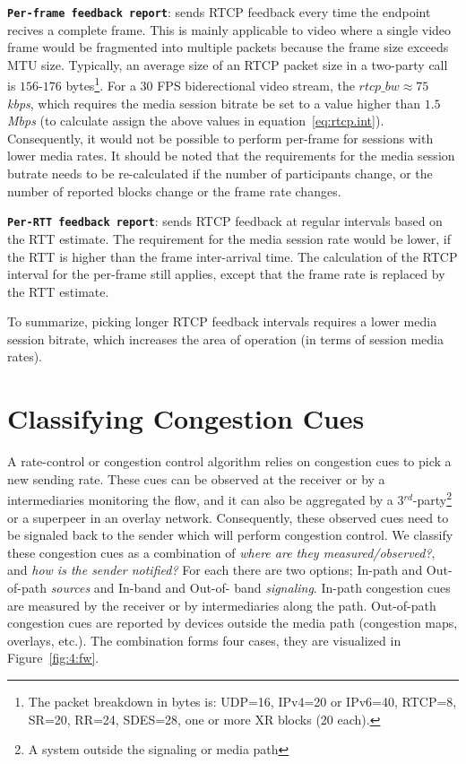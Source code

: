 \textbf{\texttt{Per-frame feedback report}}: sends RTCP feedback every time
the endpoint recives a complete frame. This is mainly applicable to video
where a single video frame would be fragmented into multiple packets because
the frame size exceeds MTU size. Typically, an average size of an RTCP packet
size in a two-party call is $156$-$176$ bytes\footnote{The packet breakdown in
bytes is: UDP=16, IPv4=20 or IPv6=40, RTCP=8, SR=20, RR=24, SDES=28, one or
more XR blocks (20 each).}. For a 30 FPS biderectional video stream, the
$rtcp\_bw \approx 75$ \emph{kbps}, which requires the media session bitrate be
set to a value higher than $1.5$ \emph{Mbps} (to calculate assign the above
values in equation~\ref{eq:rtcp.int}). Consequently, it would not be possible
to perform per-frame for sessions with lower media rates. It should be noted
that the requirements for the media session butrate needs to be re-calculated
if the number of participants change, or the number of reported blocks change
or the frame rate changes.

\textbf{\texttt{Per-RTT feedback report}}: sends RTCP feedback at regular
intervals based on the RTT estimate. The requirement for the media session
rate would be lower, if the RTT is higher than the frame inter-arrival time.
The calculation of the RTCP interval for the per-frame still applies, except
that the frame rate is replaced by the RTT estimate.

To summarize, picking longer RTCP feedback intervals requires a lower media
session bitrate, which increases the area of operation (in terms of session
media rates).

\section{Classifying Congestion Cues}
\label{fw.fw}

A rate-control or congestion control algorithm relies on congestion cues to
pick a new sending rate. These cues can be observed at the receiver or by a
intermediaries monitoring the flow, and it can also be aggregated by a
3$^{rd}$-party\footnote{A system outside the signaling or media path} or a
superpeer in an overlay network. Consequently, these observed cues need to be
signaled back to the sender which will perform congestion control. We classify
these congestion cues as a combination of \emph{where are they
measured/observed?}, and \emph{how is the sender notified?} For each there are
two options; In-path and Out-of-path \emph{sources} and In-band and Out-of-%
band \emph{signaling}. In-path congestion cues are measured by the receiver or
by intermediaries along the path. Out-of-path congestion cues are reported by
devices outside the media path (congestion maps, overlays, etc.). The
combination forms four cases, they are visualized in Figure~\ref{fig:4:fw}.

